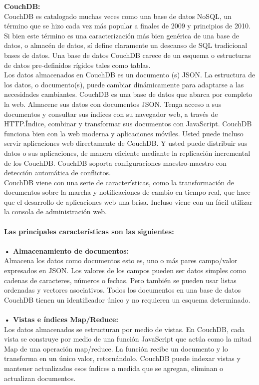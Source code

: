 \documentclass[twoside,onecolumn]{article}
\begin{document}
\begin{flushright}
\begin{itemize}
\textbf{CouchDB: }\\ CouchDB es catalogado muchas veces como una base de datos NoSQL, un término que se hizo cada vez más popular a finales de 2009 y principios de 2010. Si bien este término es una caracterización más bien genérica de una base de datos, o almacén de datos, sí define claramente un descanso de SQL tradicional bases de datos. Una base de datos CouchDB carece de un esquema o estructuras de datos pre-definidos rígidos tales como tablas. \textbf{}\\
Los datos almacenados en CouchDB es un documento (s) JSON. La estructura de los datos, o documento(s), puede cambiar dinámicamente para adaptarse a las necesidades cambiantes. 
CouchDB es una base de datos que abarca por completo la web. Almacene sus datos con documentos JSON. Tenga acceso a sus documentos y consultar sus índices con su navegador web, a través de HTTP.Índice, combinar y transformar sus documentos con JavaScript. CouchDB funciona bien con la web moderna y aplicaciones móviles. Usted puede incluso servir aplicaciones web directamente de CouchDB. Y usted puede distribuir sus datos o sus aplicaciones, de manera eficiente mediante la replicación incremental de los CouchDB. CouchDB soporta configuraciones maestro-maestro con detección automática de conflictos. \textbf{}\\
CouchDB viene con una serie de características, como la transformación de documentos sobre la marcha y notificaciones de cambio en tiempo real, que hace que el desarrollo de aplicaciones web una brisa. Incluso viene con un fácil utilizar la consola de administración web.\textbf{}\\
\textbf{}\\
 \textbf{Las principales características son las siguientes:}\\
\textbf{}\\
\textbf{•	Almacenamiento de documentos:}\\ Almacena los datos como documentos esto es, uno o más pares campo/valor expresados en JSON. Los valores de los campos pueden ser datos simples como cadenas de caracteres, números o fechas. Pero también se pueden usar listas ordenadas y vectores asociativos. Todos los documentos en una base de datos CouchDB tienen un identificador único y no requieren un esquema determinado.
\textbf{}\\
\textbf{}\\
\textbf{•	Vistas e índices Map/Reduce:}\\
 Los datos almacenados se estructuran por medio de vistas. En CouchDB, cada vista se construye por medio de una función JavaScript que actúa como la mitad Map de una operación map/reduce. La función recibe un documento y lo transforma en un único valor, retornándolo. CouchDB puede indexar vistas y mantener actualizados esos índices a medida que se agregan, eliminan o actualizan documentos.

\end{itemize}
\end{flushright}
\end{document}

